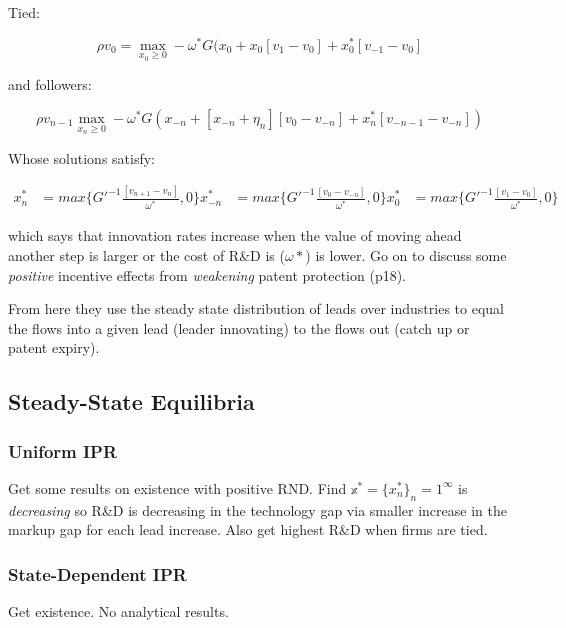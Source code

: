 \documentclass[11pt]{article}
\begin{document}
  Tied:

  \begin{equation} \label{eq:rvf_tied}
    \rho v_0 = \max_{x_0 \geq 0} -\omega^*G(x_{0} + x_{0}[v_1 - v_0] + x_0^*[v_{-1} - v_0]
  \end{equation}

  and followers:

  \begin{equation} \label{eq:rvf_follower}
    \rho v_{n-1} \max_{x_n \geq 0} -\omega^*G(x_{-n} + [x_{-n} + \eta_n][v_0 - v_{-n}] + x_n^*[v_{-n-1} - v_{-n}])
    \end{equation}

  Whose solutions satisfy:

  \begin{align} \label{eq:ss_rd_policies}
    x_n^*    &= max \big\{G'^{-1}\frac{[v_{n+1} - v_n]}{\omega^*}   ,0\}  
    x_{-n}^* &= max \big\{G'^{-1}\frac{[v_0  - v_{-n}]}{\omega^*}   ,0\}
    x_0^*    &= max \big\{G'^{-1}\frac{[v_1     - v_0]}{\omega^*}   ,0\}
  \end{align}
  
  which says that innovation rates increase when the value of moving ahead another step is larger or the cost of R\&D is ($\omega*$) is lower.  Go on to discuss some \emph{positive} incentive effects from \emph{weakening} patent protection (p18).

  From here they use the steady state distribution of leads over industries to equal the flows into a given lead (leader innovating) to the flows out (catch up or patent expiry).


\subsection{Steady-State Equilibria}
\label{sub:steady_state_equilibria}
  
  \subsubsection{Uniform IPR}
  \label{subsub:uniform_ipr}
    Get some results on existence with positive RND.  Find $\mathbb{x}^* = \{x_n^*\}_n=1^{\infty}$ is \emph{decreasing} so R\&D is decreasing in the technology gap via smaller increase in the markup gap for each lead increase.  Also get highest R\&D when firms are tied.

  \subsubsection{State-Dependent IPR}
  \label{state_dependent_ipr}
    Get existence. No analytical results.
\end{document}
